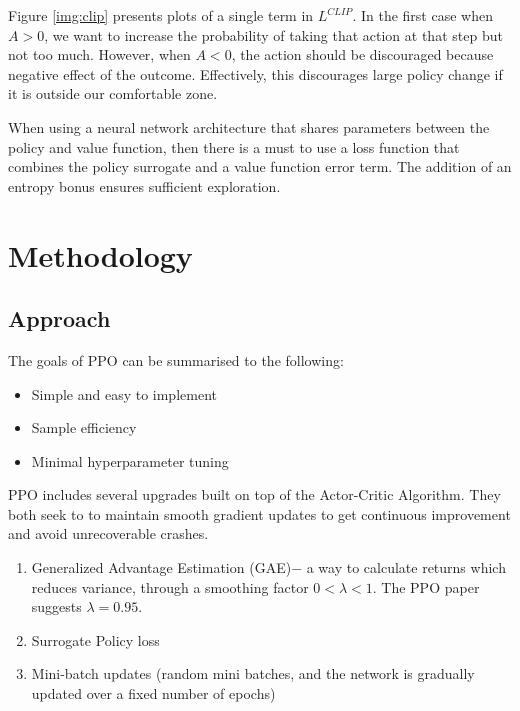 \documentclass[12pt,a4paper]{article}
\begin{document}
Figure \ref{img:clip} presents plots of a single term in $L^{CLIP}$. \newline
\noindent In the first case when $A>0$, we want to increase the probability of taking that action at that step but not too much. However, when $A<0$, the action should be discouraged because negative effect of the outcome. Effectively, this discourages large policy change if it is outside our comfortable zone. 

When using a neural network architecture that shares parameters between the policy and value function, then there is a must to use a loss function that combines the policy surrogate and a value function error term. The addition of an entropy bonus ensures sufficient exploration.

\section{Methodology}

\subsection{Approach}
The goals of PPO can be summarised to the following:
\begin{itemize}
\item Simple and easy to implement
\item Sample efficiency
\item Minimal hyperparameter tuning
\end{itemize}

PPO includes several upgrades built on top of the Actor-Critic Algorithm. They  both seek to to maintain smooth gradient updates to get continuous improvement  and avoid unrecoverable crashes.
\begin{enumerate}
\item Generalized Advantage Estimation (GAE)$-$ a way to calculate returns which reduces variance, through  a smoothing factor $0< \lambda < 1$. The PPO paper suggests $\lambda = 0.95$.
\item Surrogate Policy loss
\item Mini-batch updates (random mini batches, and the network is gradually  updated over a fixed number of epochs)
\end{enumerate}
\end{document}
